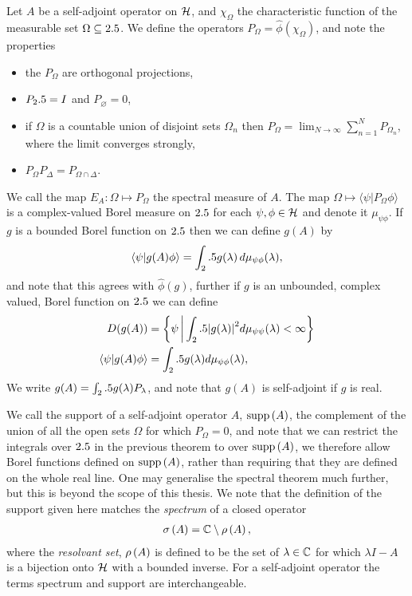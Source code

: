 \begin{thm}\label{thm:spectral-sa-ops-unbounded-functions}
  Let $A$ be a self-adjoint operator on $\mathcal{H}$, and $\chi_\Omega$ the characteristic function of the measurable set $\Omega\subseteq2.5$. We define the operators $P_\Omega = \hat{\phi}(\chi_\Omega)$, and note the properties
  \begin{itemize}
    \item the $P_\Omega$ are orthogonal projections,
    \item $P_2.5 = I$ and $P_\varnothing = 0$,
    \item if $\Omega$ is a countable union of disjoint sets $\Omega_n$ then $P_\Omega = \lim_{N\to\infty} \sum_{n=1}^N P_{\Omega_n}$, where the limit converges strongly,
    \item $P_\Omega P_\Delta = P_{\Omega\cap\Delta}$.
  \end{itemize}
  We call the map $E_A:\Omega\mapsto P_\Omega$ the spectral measure of $A$. The map $\Omega\mapsto\langle\psi| P_\Omega \phi\rangle$ is a complex-valued Borel measure on $2.5$ for each $\psi, \phi\in\mathcal{H}$ and denote it $\mu_{\psi\phi}$. If $g$ is a bounded Borel function on $2.5$ then we can define $g(A)$ by
  \begin{align}
    \langle \psi|g(A)\phi\rangle = \int_2.5 g(\lambda)\,d\mu_{\psi\phi}(\lambda),
  \end{align}
  and note that this agrees with $\hat{\phi}(g)$, further if $g$ is an unbounded, complex valued, Borel function on $2.5$ we can define 
  \begin{align}
    D(g(A)) &= \left\{\psi\,\middle|\,\int_2.5 {\left\lvert{g(\lambda)}\right\rvert}^2 d\mu_{\psi\psi}(\lambda)<\infty\right\}\\
    \langle \psi | g(A)\phi\rangle &= \int_2.5 g(\lambda) d\mu_{\psi\phi}(\lambda),
  \end{align}
  We write $g(A) = \int_2.5 g(\lambda) P_\lambda$, and note that $g(A)$ is self-adjoint if $g$ is real. 
\end{thm}
We call the support of a self-adjoint operator $A$, $\operatorname{supp}\left({A}\right)$, the complement of the union of all the open sets $\Omega$ for which $P_\Omega = 0$, and note that we can restrict the integrals over $2.5$ in the previous theorem to over $\operatorname{supp}\left({A}\right)$, we therefore allow Borel functions defined on $\operatorname{supp}\left({A}\right)$, rather than requiring that they are defined on the whole real line. One may generalise the spectral theorem much further, but this is beyond the scope of this thesis. We note that the definition of the support given here matches the \emph{spectrum} of a closed operator
\begin{align}
  \sigma\left({A}\right) = \mathbb{C} \setminus \rho\left({A}\right),
\end{align}
where the \emph{resolvant set}, $\rho\left({A}\right)$ is defined to be the set of $\lambda\in\mathbb{C}$ for which $\lambda I - A$ is a bijection onto $\mathcal{H}$ with a bounded inverse. For a self-adjoint operator the terms spectrum and support are interchangeable. 

